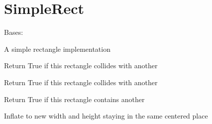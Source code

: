 \documentclass[letterpaper,10pt,english]{sphinxmanual}
\begin{document}
\section{SimpleRect}
\label{geometry:simplerect}

\begin{fulllineitems}
\label{geometry:serge.geometry.SimpleRect}
Bases: 

A simple rectangle implementation

\begin{fulllineitems}
\label{geometry:serge.geometry.SimpleRect.collidepoint}
Return True if this rectangle collides with another

\end{fulllineitems}


\begin{fulllineitems}
\label{geometry:serge.geometry.SimpleRect.colliderect}
Return True if this rectangle collides with another

\end{fulllineitems}


\begin{fulllineitems}
\label{geometry:serge.geometry.SimpleRect.contains}
Return True if this rectangle contains another

\end{fulllineitems}


\begin{fulllineitems}
\label{geometry:serge.geometry.SimpleRect.inflate}
Inflate to new width and height staying in the same centered place

\end{fulllineitems}



\end{fulllineitems}
\end{document}
